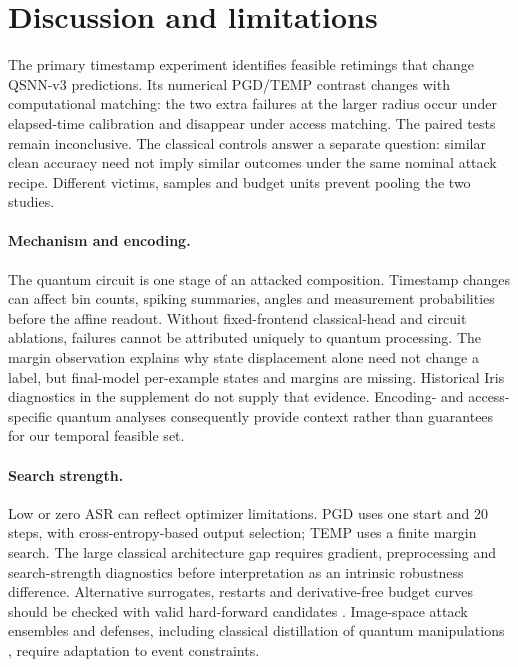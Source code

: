 \section{Discussion and limitations}\label{sec:discussion}
The primary timestamp experiment identifies feasible retimings that change QSNN-v3 predictions. Its numerical PGD/TEMP contrast changes with computational matching: the two extra failures at the larger radius occur under elapsed-time calibration and disappear under access matching. The paired tests remain inconclusive. The classical controls answer a separate question: similar clean accuracy need not imply similar outcomes under the same nominal attack recipe. Different victims, samples and budget units prevent pooling the two studies.

\paragraph{Mechanism and encoding.}
The quantum circuit is one stage of an attacked composition. Timestamp changes can affect bin counts, spiking summaries, angles and measurement probabilities before the affine readout. Without fixed-frontend classical-head and circuit ablations, failures cannot be attributed uniquely to quantum processing. The margin observation explains why state displacement alone need not change a label, but final-model per-example states and margins are missing. Historical Iris diagnostics in the supplement do not supply that evidence. Encoding- and access-specific quantum analyses \cite{wendlinger2024comparative,gong2024randomized,dowling2026guarantees} consequently provide context rather than guarantees for our temporal feasible set.

\paragraph{Search strength.}
Low or zero ASR can reflect optimizer limitations. PGD uses one start and 20 steps, with cross-entropy-based output selection; TEMP uses a finite margin search. The large classical architecture gap requires gradient, preprocessing and search-strength diagnostics before interpretation as an intrinsic robustness difference. Alternative surrogates, restarts and derivative-free budget curves should be checked with valid hard-forward candidates \cite{athalye2018obfuscated,croce2020reliable}. Image-space attack ensembles and defenses, including classical distillation of quantum manipulations \cite{khatun2025distillation}, require adaptation to event constraints.

